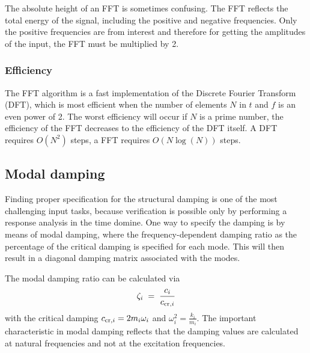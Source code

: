 The absolute height of an FFT is sometimes confusing.
The FFT reflects the total energy of the signal,
including the positive and negative frequencies.
Only the positive frequencies are from interest and therefore for
getting the amplitudes of the input, the FFT must be multiplied by 2.

\subsubsection{Efficiency}

The FFT algorithm is a fast implementation of the Discrete Fourier Transform
(DFT), which is most efficient when the number of elements $N$ in $t$ and $f$
is an even power of 2.
The worst efficiency will occur if $N$ is a prime number,
the efficiency of the FFT decreases to the efficiency of the DFT itself.
A DFT requires $O(N^2)$ steps, a FFT requires $O(N\log(N))$ steps.

\subsection{Modal damping}
\label{subs:Modal Damping}

Finding proper specification for the structural damping is one of the most
challenging input tasks, because verification is possible only by performing
a response analysis in the time domine.
One way to specify the damping is by means of modal damping,
where the frequency-dependent damping ratio as the percentage of the critical
damping is specified for each mode.
This will then result in a diagonal damping matrix associated with the modes.

The modal damping ratio can be calculated via
%
\begin{equation}
\label{eq:modal_damping}
\zeta_i \;=\; \frac{c_i}{c_{{\rm cr},i}}
\end{equation}
%
with the critical damping $c_{{\rm cr},i}=2m_i\omega_i$
and $\omega_i^2=\frac{k_i}{m_i}$.
The important characteristic in modal damping reflects that the damping values
are calculated at natural frequencies and not at the excitation frequencies.
